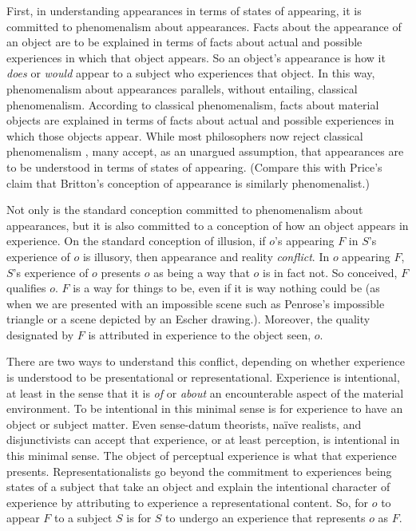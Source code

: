 \documentclass[12pt]{article}
\begin{document}
First, in understanding appearances in terms of states of appearing, it is committed to phenomenalism about appearances. Facts about the appearance of an object are to be explained in terms of facts about actual and possible experiences in which that object appears. So an object's appearance is how it \emph{does} or \emph{would} appear to a subject who experiences that object. In this way, phenomenalism about appearances parallels, without entailing, classical phenomenalism. According to classical phenomenalism, facts about material objects are explained in terms of facts about actual and possible experiences in which those objects appear. While most philosophers now reject classical phenomenalism \citep[though see][]{Foster:00ny}, many accept, as an unargued assumption, that appearances are to be understood in terms of states of appearing. (Compare this with Price's \citeyear{Price:1952ix} claim that Britton's \citeyear{Britton:1926zm} conception of appearance is similarly phenomenalist.)

Not only is the standard conception committed to phenomenalism about appearances, but it is also committed to a conception of how an object appears in experience. On the standard conception of illusion, if \( o \)'s appearing \( F \) in \( S \)'s experience of \( o \) is illusory, then appearance and reality \emph{conflict}. In \( o \) appearing \( F \), \( S \)'s experience of \( o \) presents \( o \) as being a way that \( o \) is in fact not. So conceived, \( F \) qualifies \( o \). \( F \) is a way for things to be, even if it is way nothing could be (as when we are presented with an impossible scene such as Penrose's \citeyear{Penrose:1958kx} impossible triangle or a scene depicted by an Escher drawing.). Moreover, the quality designated by \( F \) is attributed in experience to the object seen, \( o \).

There are two ways to understand this conflict, depending on whether experience is understood to be presentational or representational. Experience is intentional, at least in the sense that it is \emph{of} or \emph{about} an encounterable aspect of the material environment. To be intentional in this minimal sense is for experience to have an object or subject matter. Even sense-datum theorists, naïve realists, and disjunctivists can accept that experience, or at least perception, is intentional in this minimal sense. The object of perceptual experience is what that experience presents. Representationalists go beyond the commitment to experiences being states of a subject that take an object and explain the intentional character of experience by attributing to experience a representational content. So, for \( o \) to appear \( F \) to a subject \( S \) is for \( S \) to undergo an experience that represents \( o \) as \( F \). 
\end{document}
